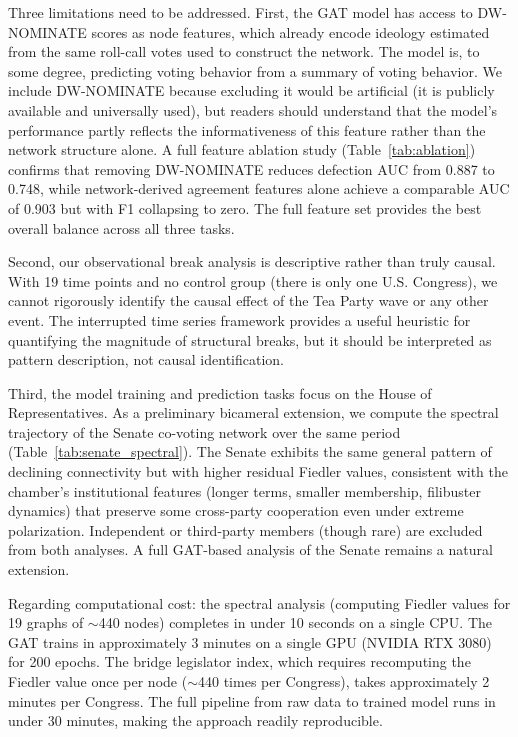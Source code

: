 \documentclass[12pt, a4paper]{article}
\begin{document}
Three limitations need to be addressed. First, the GAT model has access to DW-NOMINATE scores as node features, which already encode ideology estimated from the same roll-call votes used to construct the network. The model is, to some degree, predicting voting behavior from a summary of voting behavior. We include DW-NOMINATE because excluding it would be artificial (it is publicly available and universally used), but readers should understand that the model's performance partly reflects the informativeness of this feature rather than the network structure alone. A full feature ablation study (Table~\ref{tab:ablation}) confirms that removing DW-NOMINATE reduces defection AUC from 0.887 to 0.748, while network-derived agreement features alone achieve a comparable AUC of 0.903 but with F1 collapsing to zero. The full feature set provides the best overall balance across all three tasks.

Second, our observational break analysis is descriptive rather than truly causal. With 19 time points and no control group (there is only one U.S. Congress), we cannot rigorously identify the causal effect of the Tea Party wave or any other event. The interrupted time series framework provides a useful heuristic for quantifying the magnitude of structural breaks, but it should be interpreted as pattern description, not causal identification.

Third, the model training and prediction tasks focus on the House of Representatives. As a preliminary bicameral extension, we compute the spectral trajectory of the Senate co-voting network over the same period (Table~\ref{tab:senate_spectral}). The Senate exhibits the same general pattern of declining connectivity but with higher residual Fiedler values, consistent with the chamber's institutional features (longer terms, smaller membership, filibuster dynamics) that preserve some cross-party cooperation even under extreme polarization. Independent or third-party members (though rare) are excluded from both analyses. A full GAT-based analysis of the Senate remains a natural extension.

Regarding computational cost: the spectral analysis (computing Fiedler values for 19 graphs of $\sim$440 nodes) completes in under 10 seconds on a single CPU. The GAT trains in approximately 3 minutes on a single GPU (NVIDIA RTX 3080) for 200 epochs. The bridge legislator index, which requires recomputing the Fiedler value once per node ($\sim$440 times per Congress), takes approximately 2 minutes per Congress. The full pipeline from raw data to trained model runs in under 30 minutes, making the approach readily reproducible.
\end{document}
